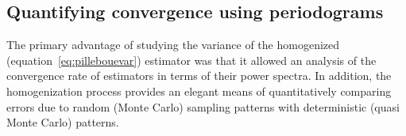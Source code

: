 \subsection{Quantifying convergence using periodograms}
The primary advantage of studying the variance of the homogenized (equation~\ref{eq:pillebouevar}) estimator was that it allowed an analysis of the convergence rate of estimators in terms of their power spectra. In addition, the homogenization process provides an elegant means of quantitatively comparing errors due to random (Monte Carlo) sampling patterns with deterministic (quasi Monte Carlo) patterns. 
\TBC